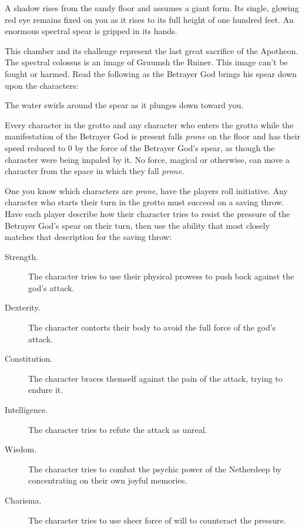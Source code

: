 \documentclass[letterpaper, 11pt, bg=full, twocolumn]{dndbook}
\begin{document}
\begin{DndReadAloud}
A shadow rises from the sandy floor and assumes a giant form. Its single, glowing red eye remains fixed on you as it rises to its full height of one hundred feet. An enormous spectral spear is gripped in its hands.
\end{DndReadAloud}

This chamber and its challenge represent the last great sacrifice of the Apotheon. The spectral colossus is an image of Gruumsh the Ruiner. This image can't be fought or harmed. Read the following as the Betrayer God brings his spear down upon the characters:

\begin{DndReadAloud}
The water swirls around the spear as it plunges down toward you.
\end{DndReadAloud}

Every character in the grotto and any character who enters the grotto while the manifestation of the Betrayer God is present falls \textit{prone} on the floor and has their speed reduced to 0 by the force of the Betrayer God's spear, as though the character were being impaled by it. No force, magical or otherwise, can move a character from the space in which they fall \textit{prone}.

One you know which characters are \textit{prone}, have the players roll initiative. Any character who starts their turn in the grotto must succeed on a saving throw. Have each player describe how their character tries to resist the pressure of the Betrayer God's spear on their turn, then use the ability that most closely matches that description for the saving throw:

\begin{description}
\item[Strength.] The character tries to use their physical prowess to push back against the god's attack.
\item[Dexterity.] The character contorts their body to avoid the full force of the god's attack.
\item[Constitution.] The character braces themself against the pain of the attack, trying to endure it.
\item[Intelligence.] The character tries to refute the attack as unreal.
\item[Wisdom.] The character tries to combat the psychic power of the Netherdeep by concentrating on their own joyful memories.
\item[Charisma.] The character tries to use sheer force of will to counteract the pressure.
\end{description}
\end{document}
